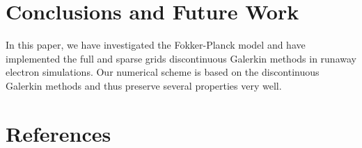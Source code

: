 \documentclass[preprint,11pt]{elsarticle}
\begin{document}
\section{Conclusions and Future Work}
\label{sec:Con}
In this paper, we have investigated the Fokker-Planck model and have implemented the full and sparse grids discontinuous Galerkin methods in runaway electron simulations. Our numerical scheme is based on the discontinuous Galerkin methods and thus preserve several properties very well.


\section{References}


\end{document}
